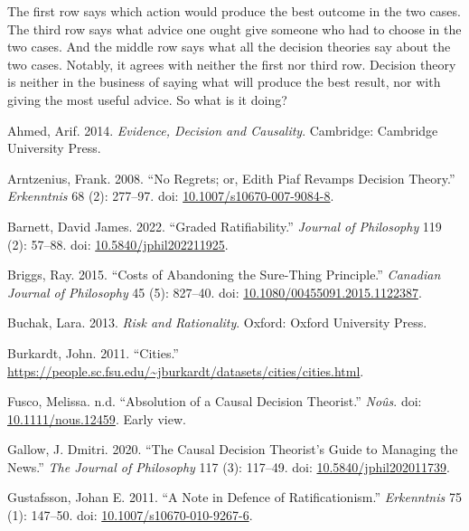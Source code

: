 \documentclass[
  10pt,
  letterpaper,
  DIV=11,
  numbers=noendperiod,
  twoside]{scrartcl}
\newlength{\cslhangindent}
\newenvironment{CSLReferences}[2] %
 {\begin{list}{}{%
  \setlength{\itemindent}{0pt}
  \setlength{\leftmargin}{0pt}
  \setlength{\parsep}{0pt}
  \ifodd #1
   \setlength{\leftmargin}{\cslhangindent}
   \setlength{\itemindent}{-1\cslhangindent}
  \fi
  \setlength{\itemsep}{#2\baselineskip}}}
 {\end{list}}
\begin{document}
The first row says which action would produce the best outcome in the
two cases. The third row says what advice one ought give someone who had
to choose in the two cases. And the middle row says what all the
decision theories say about the two cases. Notably, it agrees with
neither the first nor third row. Decision theory is neither in the
business of saying what will produce the best result, nor with giving
the most useful advice. So what is it doing?

\label{refs}
\begin{CSLReferences}{1}{0}
Ahmed, Arif. 2014. \emph{Evidence, Decision and Causality}. Cambridge:
{C}ambridge {U}niversity {P}ress.

Arntzenius, Frank. 2008. {``No Regrets; or, Edith Piaf Revamps Decision
Theory.''} \emph{Erkenntnis} 68 (2): 277--97. doi:
\href{https://doi.org/10.1007/s10670-007-9084-8}{10.1007/s10670-007-9084-8}.

Barnett, David James. 2022. {``Graded Ratifiability.''} \emph{Journal of
Philosophy} 119 (2): 57--88. doi:
\href{https://doi.org/10.5840/jphil202211925}{10.5840/jphil202211925}.

Briggs, Ray. 2015. {``Costs of Abandoning the Sure-Thing Principle.''}
\emph{Canadian Journal of Philosophy} 45 (5): 827--40. doi:
\href{https://doi.org/10.1080/00455091.2015.1122387}{10.1080/00455091.2015.1122387}.

Buchak, Lara. 2013. \emph{Risk and Rationality}. Oxford: Oxford
University Press.

Burkardt, John. 2011. {``Cities.''}
\url{https://people.sc.fsu.edu/~jburkardt/datasets/cities/cities.html}.

Fusco, Melissa. n.d. {``Absolution of a Causal Decision Theorist.''}
\emph{No{û}s}. doi:
\href{https://doi.org/10.1111/nous.12459}{10.1111/nous.12459}. Early
view.

Gallow, J. Dmitri. 2020. {``The Causal Decision Theorist's Guide to
Managing the News.''} \emph{The Journal of Philosophy} 117 (3): 117--49.
doi:
\href{https://doi.org/10.5840/jphil202011739}{10.5840/jphil202011739}.

Gustafsson, Johan E. 2011. {``A Note in Defence of Ratificationism.''}
\emph{Erkenntnis} 75 (1): 147--50. doi:
\href{https://doi.org/10.1007/s10670-010-9267-6}{10.1007/s10670-010-9267-6}.


\end{CSLReferences}
\end{document}
